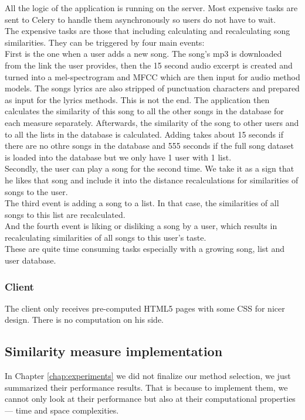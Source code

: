 All the logic of the application is running on the server. Most expensive tasks are sent to Celery to handle them asynchronously so users do not have to wait. \\
The expensive tasks are those that including calculating and recalculating song similarities. They can be triggered by four main events: \\
First is the one when a user adds a new song. The song's mp3 is downloaded from the link the user provides, then the 15 second audio excerpt is created and turned into a mel-spectrogram and MFCC which are then input for audio method models. The songs lyrics are also stripped of punctuation characters and prepared as input for the lyrics methods. This is not the end. The application then calculates the similarity of this song to all the other songs in the database for each measure separately. Afterwards, the similarity of the song to other users and to all the lists in the database is calculated. Adding takes about 15 seconds if there are no othre songs in the database and 555 seconds if the full song dataset is loaded into the database but we only have 1 user with 1 list. \\ 
Secondly, the user can play a song for the second time. We take it as a sign that he likes that song and include it into the distance recalculations for similarities of songs to the user.\\
The third event is adding a song to a list. In that case, the similarities of all songs to this list are recalculated. \\
And the fourth event is liking or disliking a song by a user, which results in recalculating similarities of all songs to this user's taste. \\
These are quite time consuming tasks especially with a growing song, list and user database. \\

\subsubsection{Client}
The client only receives pre-computed HTML5 pages with some CSS for nicer design. There is no computation on his side.

\subsection{Similarity measure implementation}\label{ssec:measure_implementation}

In Chapter \ref{chap:experiments} we did not finalize our method selection, we just summarized their performance results. That is because to implement them, we cannot only look at their performance but also at their computational properties --- time and space complexities. \\

